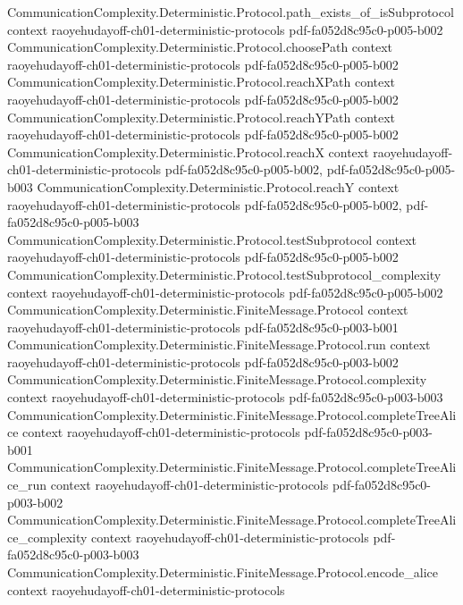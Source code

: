 \begin{theorem}
\proofstep
  {CommunicationComplexity.Deterministic.Protocol.path_exists_of_isSubprotocol}
  {context}
  {raoyehudayoff-ch01-deterministic-protocols}
  {pdf-fa052d8c95c0-p005-b002}
\proofstep
  {CommunicationComplexity.Deterministic.Protocol.choosePath}
  {context}
  {raoyehudayoff-ch01-deterministic-protocols}
  {pdf-fa052d8c95c0-p005-b002}
\proofstep
  {CommunicationComplexity.Deterministic.Protocol.reachXPath}
  {context}
  {raoyehudayoff-ch01-deterministic-protocols}
  {pdf-fa052d8c95c0-p005-b002}
\proofstep
  {CommunicationComplexity.Deterministic.Protocol.reachYPath}
  {context}
  {raoyehudayoff-ch01-deterministic-protocols}
  {pdf-fa052d8c95c0-p005-b002}
\proofstep
  {CommunicationComplexity.Deterministic.Protocol.reachX}
  {context}
  {raoyehudayoff-ch01-deterministic-protocols}
  {pdf-fa052d8c95c0-p005-b002,
    pdf-fa052d8c95c0-p005-b003}
\proofstep
  {CommunicationComplexity.Deterministic.Protocol.reachY}
  {context}
  {raoyehudayoff-ch01-deterministic-protocols}
  {pdf-fa052d8c95c0-p005-b002,
    pdf-fa052d8c95c0-p005-b003}
\proofstep
  {CommunicationComplexity.Deterministic.Protocol.testSubprotocol}
  {context}
  {raoyehudayoff-ch01-deterministic-protocols}
  {pdf-fa052d8c95c0-p005-b002}
\proofstep
  {CommunicationComplexity.Deterministic.Protocol.testSubprotocol_complexity}
  {context}
  {raoyehudayoff-ch01-deterministic-protocols}
  {pdf-fa052d8c95c0-p005-b002}
\proofstep
  {CommunicationComplexity.Deterministic.FiniteMessage.Protocol}
  {context}
  {raoyehudayoff-ch01-deterministic-protocols}
  {pdf-fa052d8c95c0-p003-b001}
\proofstep
  {CommunicationComplexity.Deterministic.FiniteMessage.Protocol.run}
  {context}
  {raoyehudayoff-ch01-deterministic-protocols}
  {pdf-fa052d8c95c0-p003-b002}
\proofstep
  {CommunicationComplexity.Deterministic.FiniteMessage.Protocol.complexity}
  {context}
  {raoyehudayoff-ch01-deterministic-protocols}
  {pdf-fa052d8c95c0-p003-b003}
\proofstep
  {CommunicationComplexity.Deterministic.FiniteMessage.Protocol.completeTreeAlice}
  {context}
  {raoyehudayoff-ch01-deterministic-protocols}
  {pdf-fa052d8c95c0-p003-b001}
\proofstep
  {CommunicationComplexity.Deterministic.FiniteMessage.Protocol.completeTreeAlice_run}
  {context}
  {raoyehudayoff-ch01-deterministic-protocols}
  {pdf-fa052d8c95c0-p003-b002}
\proofstep
  {CommunicationComplexity.Deterministic.FiniteMessage.Protocol.completeTreeAlice_complexity}
  {context}
  {raoyehudayoff-ch01-deterministic-protocols}
  {pdf-fa052d8c95c0-p003-b003}
\proofstep
  {CommunicationComplexity.Deterministic.FiniteMessage.Protocol.encode_alice}
  {context}
  {raoyehudayoff-ch01-deterministic-protocols}

\end{theorem}
